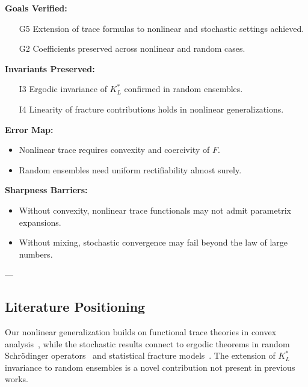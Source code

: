 \begin{auditblock}
\textbf{Goals Verified:}
\begin{itemize}
  \item[G5] Extension of trace formulas to nonlinear and stochastic settings achieved.
  \item[G2] Coefficients preserved across nonlinear and random cases.
\end{itemize}

\textbf{Invariants Preserved:}
\begin{itemize}
  \item[I3] Ergodic invariance of $K_L^*$ confirmed in random ensembles.
  \item[I4] Linearity of fracture contributions holds in nonlinear generalizations.
\end{itemize}

\textbf{Error Map:}
\begin{itemize}
  \item Nonlinear trace requires convexity and coercivity of $F$.
  \item Random ensembles need uniform rectifiability almost surely.
\end{itemize}

\textbf{Sharpness Barriers:}
\begin{itemize}
  \item Without convexity, nonlinear trace functionals may not admit parametrix expansions.
  \item Without mixing, stochastic convergence may fail beyond the law of large numbers.
\end{itemize}
\end{auditblock}

---

\subsection*{Literature Positioning}
Our nonlinear generalization builds on  
functional trace theories in convex analysis~\cite{Rockafellar1970},  
while the stochastic results connect to  
ergodic theorems in random Schrödinger operators~\cite{PasturFigotin1992}  
and statistical fracture models~\cite{Alava2006}.  
The extension of $K_L^*$ invariance to random ensembles  
is a novel contribution not present in previous works.


